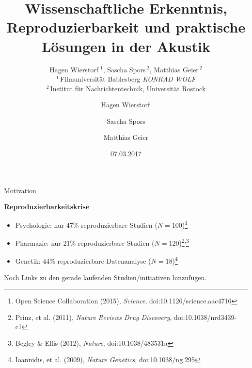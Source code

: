 \documentclass{beamer}
\begin{document}
\title{Wissenschaftliche Erkenntnis, Reproduzierbarkeit und praktische Lösungen
in der Akustik}
\subtitle{Hagen Wierstorf$\;^1$, Sascha Spors$\,^2$, Matthias Geier$\,^2$\\%
          \vspace{0.5cm}%
          \footnotesize{%
          $^1\,$Filmuniversität Bablesberg \emph{KONRAD WOLF}\\%
          $^2\,$Institut für Nachrichtentechnik, Universität Rostock}}
\author{Hagen Wierstorf$\,$ \and
        Sascha Spors \and
        Matthias Geier}
\date{07.03.2017}
\maketitle

\begin{frame}{Motivation}

    \textbf{Reproduzierbarkeitskrise}

    \begin{itemize}
        \item Psychologie: nur $47$\% reproduzierbare Studien ($N=100$)\footnote{%
            Open Science Collaboration (2015), \emph{Science},
            doi:10.1126/science.aac4716}
        \item Pharmazie: nur $21$\% reproduzierbare Studien ($N=120$)\footnote{%
            Prinz, et al. (2011), \emph{Nature Reviews Drug Discovery},
            doi:10.1038/nrd3439-c1}\textsuperscript{,}\footnote{%
            Begley \& Ellis (2012), \emph{Nature},
            doi:10.1038/483531a}
        \item Genetik: $44$\% reproduzierbare Datenanalyse ($N=18$)\footnote{%
            Ioannidis, et al. (2009), \emph{Nature Genetics},
            doi:10.1038/ng.295}
    \end{itemize}

    Noch Links zu den gerade laufenden Studien/initiativen hinzufügen.

\end{frame}
\end{document}
